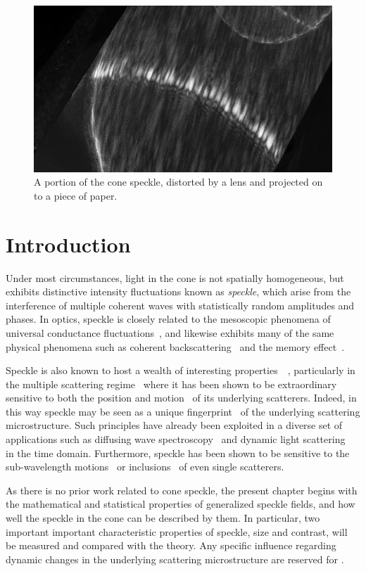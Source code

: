 \begin{figure}[ht]
\centering
\includegraphics[keepaspectratio,width=15cm]{speckle/figures/Ag_LaSFN9_cone_lens11_cam-8899.jpg}
\caption{A portion of the cone speckle, distorted by a lens and projected on to a piece of paper.}
\label{fig:examplespeckle}
\end{figure}
\section{Introduction}

Under most circumstances, light in the cone is not spatially homogeneous, but
exhibits distinctive intensity fluctuations known as \textit{speckle}, which
arise from the interference of multiple coherent waves with statistically
random amplitudes and phases.  In optics, speckle is closely related to the
mesoscopic phenomena of universal conductance
fluctuations~\cite{lee1985universal}, and likewise exhibits many of the same
physical phenomena such as coherent
backscattering~\cite{akkermans1986coherent} and the memory
effect~\cite{freund1988memory}.

Speckle is also known to host a wealth of interesting
properties~\cite{goodman1975statistical}~\cite{freund19981001}, particularly
in the multiple scattering regime~\cite{feng1986sensitivity} where it has been
shown to be extraordinary sensitive to both the position and
motion~\cite{berkovits1994correlations} of its underlying scatterers.  Indeed,
in this way speckle may be seen as a unique
fingerprint~\cite{ravikanth2001physical} of the underlying scattering
microstructure.  Such principles have already been exploited in a diverse set
of applications such as diffusing wave spectroscopy~\cite{pine1988diffusing}
and dynamic light scattering~\cite{berne2000dynamic} in the time domain.
Furthermore, speckle has been shown to be sensitive to the sub-wavelength
motions~\cite{berkovits1991sensitivity} or
inclusions~\cite{berkovits1990theory} of even single scatterers.

As there is no prior work related to cone speckle, the present chapter begins
with the mathematical and statistical properties of generalized speckle
fields, and how well the speckle in the cone can be described by them.  In
particular, two important important characteristic properties of speckle, size
and contrast, will be measured and compared with the theory.  Any specific
influence regarding dynamic changes in the underlying scattering
microstructure are reserved for .
